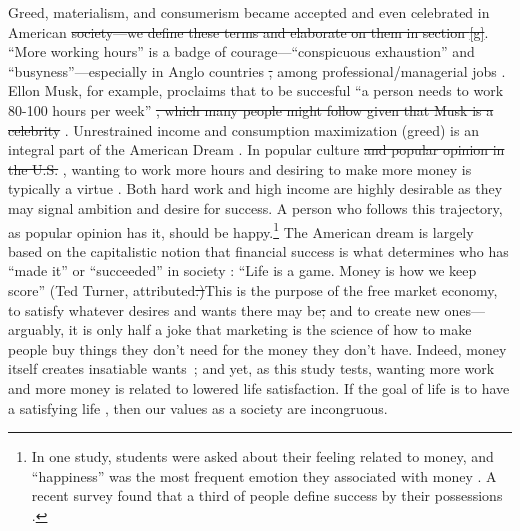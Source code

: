 \documentclass[10pt, letterpaper]{article}
\providecommand{\DIFaddtex}[1]{{\protect\color{blue}\uwave{#1}}} %
\providecommand{\DIFdeltex}[1]{{\protect\color{red}\sout{#1}}}                      %
\providecommand{\DIFaddbegin}{} %
\providecommand{\DIFaddend}{} %
\providecommand{\DIFdelbegin}{} %
\providecommand{\DIFdelend}{} %
\providecommand{\DIFadd}[1]{\texorpdfstring{\DIFaddtex{#1}}{#1}} %
\providecommand{\DIFdel}[1]{\texorpdfstring{\DIFdeltex{#1}}{}} %
\newcommand{\DIFscaledelfig}{0.5}
\newlength{\DIFdelgraphicswidth} %
\newlength{\DIFdelgraphicsheight} %
\newcommand{\DIFaddincludegraphics}[2][]{{\color{blue}\fbox{\DIFOincludegraphics[#1]{#2}}}} %
\newcommand{\DIFdelincludegraphics}[2][]{%
\sbox{\DIFdelgraphicsbox}{\DIFOincludegraphics[#1]{#2}}%
\settoboxwidth{\DIFdelgraphicswidth}{\DIFdelgraphicsbox} %
\settoboxtotalheight{\DIFdelgraphicsheight}{\DIFdelgraphicsbox} %
\scalebox{\DIFscaledelfig}{%
\parbox[b]{\DIFdelgraphicswidth}{\usebox{\DIFdelgraphicsbox}\\[-\baselineskip] \rule{\DIFdelgraphicswidth}{0em}}\llap{\resizebox{\DIFdelgraphicswidth}{\DIFdelgraphicsheight}{%
\setlength{\unitlength}{\DIFdelgraphicswidth}%
\begin{picture}(1,1)%
\thicklines\linethickness{2pt} %
{\color[rgb]{1,0,0}\put(0,0){\framebox(1,1){}}}%
{\color[rgb]{1,0,0}\put(0,0){\line( 1,1){1}}}%
{\color[rgb]{1,0,0}\put(0,1){\line(1,-1){1}}}%
\end{picture}%
}\hspace*{3pt}}} %
} %
\DeclareRobustCommand{\DIFaddbegin}{\DIFOaddbegin \let\includegraphics\DIFaddincludegraphics} %
\DeclareRobustCommand{\DIFaddend}{\DIFOaddend \let\includegraphics\DIFOincludegraphics} %
\DeclareRobustCommand{\DIFdelbegin}{\DIFOdelbegin \let\includegraphics\DIFdelincludegraphics} %
\DeclareRobustCommand{\DIFdelend}{\DIFOaddend \let\includegraphics\DIFOincludegraphics} %
\begin{document}
\begin{spacing}{1.8}
Greed, materialism, and consumerism \DIFaddbegin \DIFadd{(defined in section \ref{g}) }\DIFaddend became accepted and even celebrated in
American \DIFdelbegin \DIFdel{society---we define these terms and elaborate on them in section \ref{g}}\DIFdelend \DIFaddbegin \DIFadd{society}\DIFaddend .  ``More working hours'' is a badge of courage---``conspicuous exhaustion'' and
``busyness''---especially in Anglo countries \DIFdelbegin \DIFdel{, }\DIFdelend \DIFaddbegin \DIFadd{and }\DIFaddend among professional/managerial jobs
\citep{gershuny05}. 
%
Ellon Musk, for example, proclaims that to be succesful ``a person needs to work 80-100 hours
per week''  \citep{muskIN18nov26}\DIFdelbegin \DIFdel{, which many people might follow given that
Musk is a celebrity}\DIFdelend %
.  Unrestrained income and  consumption maximization (greed) is an integral part of the American
Dream \citep{robinson2009greed}.
%
In popular culture \DIFdelbegin \DIFdel{and popular opinion in the U.S.}\DIFdelend %
\DIFaddbegin \DIFadd{in the US}\DIFaddend , wanting to work more hours
and desiring to make more money is typically a virtue {\citep[with some exceptions, e.g.,][]{folbre2000love}.} 
Both hard work and high income are highly desirable as they may signal ambition and desire for success. A person who follows this trajectory, as popular opinion has it, should be happy.\footnote{In one study, students were asked about their feeling related to money, and ``happiness'' was the most frequent emotion they associated with money \citep{mogilner2010pursuit}.
A recent survey found that a third of people define success by their possessions \citep[cited in][]{joye20}.}
%
The American dream is largely based on the capitalistic notion that financial success is what determines who has ``made it'' or ``succeeded'' in society %
\citep{aokditella}: ``Life is a game. Money is how we keep score''  (Ted Turner, attributed\DIFdelbegin \DIFdel{.)}\DIFdelend \DIFaddbegin \DIFadd{).  }\DIFaddend This is the purpose of the free market economy, to satisfy whatever desires and wants there may be\DIFdelbegin \DIFdel{; }\DIFdelend \DIFaddbegin \DIFadd{, }\DIFaddend and to create new ones---arguably, it is only half a joke that marketing is the science of how to make people buy things they don't need for the money they don't have. 
Indeed, money itself creates insatiable wants~\citep{marx1844-human-requirements};
and yet, as this study tests, wanting more work and more money is related to
lowered life satisfaction. If the goal of life is to have a satisfying life%
, then our values as a society are incongruous.


\end{spacing}
\end{document}
